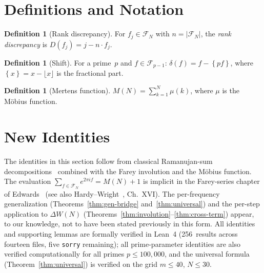 \documentclass[11pt]{article}
\theoremstyle{definition}
\newtheorem{definition}[theorem]{Definition}
\newcommand{\F}{\mathcal{F}}
\newcommand{\fpart}[1]{\left\{#1\right\}}
\begin{document}
\section{Definitions and Notation}\label{sec:defs}

\begin{definition}[Rank discrepancy]
For $f_j \in \F_N$ with $n = |\F_N|$, the \emph{rank discrepancy} is
$D(f_j) = j - n \cdot f_j$.
\end{definition}

\begin{definition}[Shift]
For a prime~$p$ and $f \in \F_{p-1}$:
$\delta(f) = f - \fpart{pf}$,
where $\fpart{x} = x - \lfloor x \rfloor$ is the fractional part.
\end{definition}

\begin{definition}[Mertens function]
$M(N) = \sum_{k=1}^{N} \mu(k)$,
where $\mu$ is the M\"obius function.
\end{definition}


\section{New Identities}\label{sec:identities}

The identities in this section follow from classical
Ramanujan-sum decompositions~\cite{Ramanujan1918, Kanemitsu1982}
combined with the Farey involution and the M\"obius function.
The evaluation $\sum_{f \in \F_N} e^{2\pi i f} = M(N)+1$ is
implicit in the Farey-series chapter of Edwards~\cite{Edwards1974}
(see also Hardy--Wright~\cite{HardyWright2008}, Ch.~XVI\@).
The per-frequency generalization (Theorems~\ref{thm:gen-bridge}
and~\ref{thm:universal}) and the per-step application to
$\Delta W(N)$ (Theorems~\ref{thm:involution}--\ref{thm:cross-term})
appear, to our knowledge, not to have been stated previously
in this form.  All identities and supporting lemmas are
formally verified in Lean~4 (256~results across fourteen files,
five \texttt{sorry} remaining); all prime-parameter identities
are also verified
computationally for all primes $p \le 100{,}000$, and the universal
formula (Theorem~\ref{thm:universal}) is verified on the grid
$m \le 40$, $N \le 30$.
\end{document}
